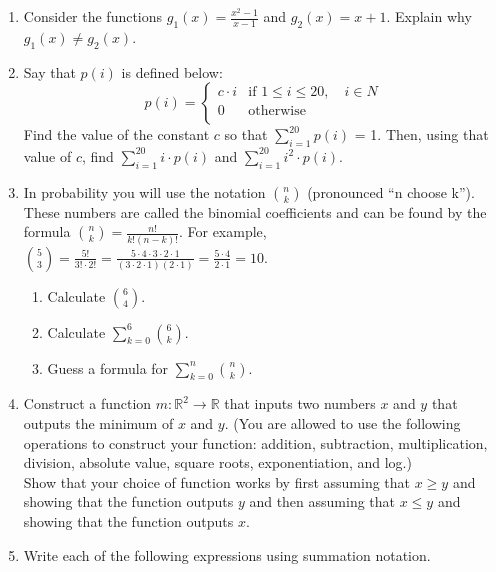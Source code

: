 \documentclass{article}
\begin{document}
\begin{itemize}
\begin{enumerate}
                    \item Consider the functions $\displaystyle g_1(x) = \frac{x^2-1}{x-1}$ and $\displaystyle g_2(x)= x+1$. Explain why $g_1(x) \neq g_2(x)$.
                    \item Say that $p(i)$ is defined below:
                        $$ p(i) = \begin{cases} 
                        c\cdot i & \text{if $1 
                        \leq i \leq 20, \quad i \in N$} \\
                        0 & \text{otherwise} \\
                        \end{cases}
                        $$
                        Find the value of the constant $c$ so that $\displaystyle \sum_{i=1}^{20} p(i)$ = 1. Then, using that value of $c$, find $\displaystyle \sum_{i=1}^{20} i\cdot p(i)$ and $\displaystyle \sum_{i=1}^{20} i^2 \cdot p(i)$. 
                    \item In probability you will use the notation $\displaystyle n\choose k$ (pronounced ``n choose k''). These numbers are called the binomial coefficients and can be found by the formula ${n\choose k} = \frac{n!}{k!(n-k)!}$. For example, ${5 \choose 3}= \frac{5!}{3!\cdot2!}=\frac{5\cdot 4\cdot 3 \cdot 2 \cdot 1}{(3\cdot 2 \cdot 1) (2 \cdot 1)} = \frac{5\cdot4}{2\cdot 1} = 10$.
                        \begin{enumerate}
                            \item Calculate $\displaystyle {6 \choose 4}$.
                            \item Calculate $\displaystyle \sum_{k=0}^6 {6\choose k}$.
                            \item Guess a formula for $\displaystyle \sum_{k=0}^n {n\choose k}$.
                        \end{enumerate}
                    \item Construct a function $m:\mathbb{R}^2 \rightarrow \mathbb{R}$ that inputs two numbers $x$ and $y$ that outputs the minimum of $x$ and $y$.  (You are allowed to use the following operations to construct your function: addition, subtraction, multiplication, division, absolute value, square roots, exponentiation, and log.) \\  Show that your choice of function works by first assuming that $x\geq y$ and showing that the function outputs $y$ and then assuming that $x \leq y$ and showing that the function outputs $x$.
                    \item Write each of the following expressions using summation notation.

\end{enumerate}
\end{itemize}
\end{document}
